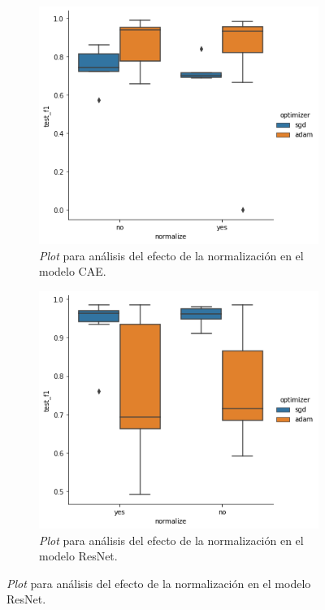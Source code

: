 \begin{figure}[H]
\begin{subfigure}{.5\textwidth}
  \centering
  \includegraphics[width=.8\linewidth]{imagenes/06_Experimentacion/normalization/caenorm.png}  
  \caption{\textit{Plot} para análisis del efecto de la normalización en el modelo CAE.}
  \label{fig:caenorm}
\end{subfigure}
\begin{subfigure}{.5\textwidth}
  \centering
  \includegraphics[width=.8\linewidth]{imagenes/06_Experimentacion/normalization/resnetnorm.png}  
  \caption{\textit{Plot} para análisis del efecto de la normalización en el modelo ResNet.}
  \label{fig:resnetnorm}
\end{subfigure}

\newline


\end{figure}

